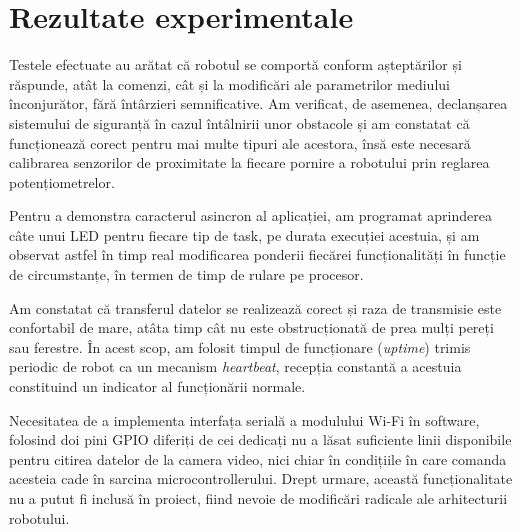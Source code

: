 \chapter{Rezultate experimentale}

Testele efectuate au arătat că robotul se comportă conform așteptărilor și răspunde, atât la comenzi, cât și la modificări ale parametrilor mediului înconjurător, fără întârzieri semnificative. Am verificat, de asemenea, declanșarea sistemului de siguranță în cazul întâlnirii unor obstacole și am constatat că funcționează corect pentru mai multe tipuri ale acestora, însă este necesară calibrarea senzorilor de proximitate la fiecare pornire a robotului prin reglarea potențiometrelor.


\newpage
Pentru a demonstra caracterul asincron al aplicației, am programat aprinderea câte unui LED pentru fiecare tip de task, pe durata execuției acestuia, și am observat astfel în timp real modificarea ponderii fiecărei funcționalități în funcție de circumstanțe, în termen de timp de rulare pe procesor.


Am constatat că transferul datelor se realizează corect și raza de transmisie este confortabil de mare, atâta timp cât nu este obstrucționată de prea mulți pereți sau ferestre. În acest scop, am folosit timpul de funcționare (\textit{uptime}) trimis periodic de robot ca un mecanism \textit{heartbeat}, recepția constantă a acestuia constituind un indicator al funcționării normale.

Necesitatea de a implementa interfața serială a modulului Wi-Fi în software, folosind doi pini GPIO diferiți de cei dedicați nu a lăsat suficiente linii disponibile pentru citirea datelor de la camera video, nici chiar în condițiile în care comanda acesteia cade în sarcina microcontrollerului. Drept urmare, această funcționalitate nu a putut fi inclusă în proiect, fiind nevoie de modificări radicale ale arhitecturii robotului.